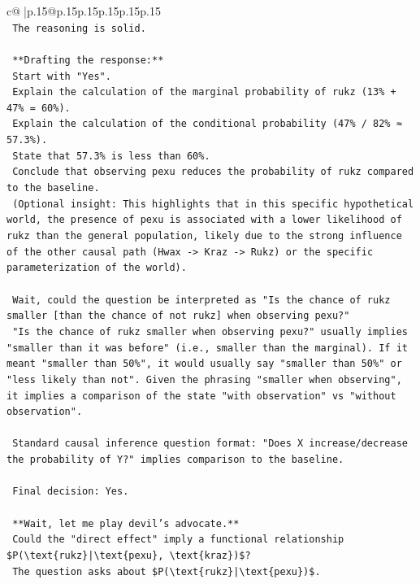 \documentclass{article}
\begin{document}
{\begin{supertabular}{c@{$\;$}|p{.15\linewidth}@{}p{.15\linewidth}p{.15\linewidth}p{.15\linewidth}p{.15\linewidth}p{.15\linewidth}}
{{{\\ 
\texttt{    The reasoning is solid.} \\
\\ 
\texttt{    **Drafting the response:**} \\
\texttt{    Start with "Yes".} \\
\texttt{    Explain the calculation of the marginal probability of rukz (13\% + 47\% = 60\%).} \\
\texttt{    Explain the calculation of the conditional probability (47\% / 82\% ≈ 57.3\%).} \\
\texttt{    State that 57.3\% is less than 60\%.} \\
\texttt{    Conclude that observing pexu reduces the probability of rukz compared to the baseline.} \\
\texttt{    (Optional insight: This highlights that in this specific hypothetical world, the presence of pexu is associated with a lower likelihood of rukz than the general population, likely due to the strong influence of the other causal path (Hwax {-}> Kraz {-}> Rukz) or the specific parameterization of the world).} \\
\\ 
\texttt{    Wait, could the question be interpreted as "Is the chance of rukz smaller {[}than the chance of not rukz{]} when observing pexu?"} \\
\texttt{    "Is the chance of rukz smaller when observing pexu?" usually implies "smaller than it was before" (i.e., smaller than the marginal). If it meant "smaller than 50\%", it would usually say "smaller than 50\%" or "less likely than not". Given the phrasing "smaller when observing", it implies a comparison of the state "with observation" vs "without observation".} \\
\\ 
\texttt{    Standard causal inference question format: "Does X increase/decrease the probability of Y?" implies comparison to the baseline.} \\
\\ 
\texttt{    Final decision: Yes.} \\
\\ 
\texttt{    **Wait, let me play devil's advocate.**} \\
\texttt{    Could the "direct effect" imply a functional relationship \$P(\textbackslash{}text\{rukz\}|\textbackslash{}text\{pexu\}, \textbackslash{}text\{kraz\})\$?} \\
\texttt{    The question asks about \$P(\textbackslash{}text\{rukz\}|\textbackslash{}text\{pexu\})\$.} \\
}}}
\end{supertabular}}
\end{document}

